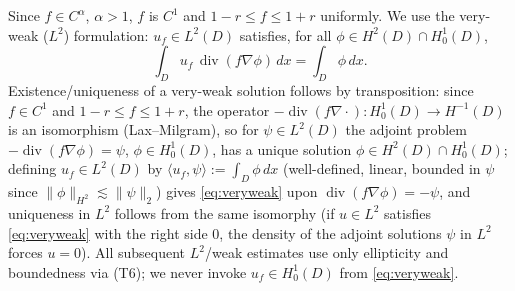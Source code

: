 \documentclass[11pt]{article}
\theoremstyle{remark}
\newcommand{\norm}[1]{\lVert #1\rVert}
\DeclareMathOperator{\diver}{div}
\begin{document}
Since $f\in C^{\alpha}$, $\alpha>1$, $f$ is $C^{1}$ and
$1-r\le f\le1+r$ uniformly. We use the very-weak ($L^{2}$) formulation:
$u_f\in L^{2}(D)$ satisfies, for all $\phi\in H^{2}(D)\cap H^{1}_{0}(D)$,
\begin{equation}\label{eq:veryweak}
\int_D u_f\,\diver(f\nabla\phi)\,dx=\int_D\phi\,dx .
\end{equation}
Existence/uniqueness of a very-weak solution follows by transposition:
since $f\in C^{1}$ and $1-r\le f\le1+r$, the operator
$-\diver(f\nabla\cdot):H^{1}_0(D)\to H^{-1}(D)$ is an isomorphism
(Lax--Milgram), so for $\psi\in L^{2}(D)$ the adjoint problem
$-\diver(f\nabla\phi)=\psi$, $\phi\in H^{1}_0(D)$, has a unique solution
$\phi\in H^{2}(D)\cap H^{1}_0(D)$; defining $u_f\in L^{2}(D)$ by
$\langle u_f,\psi\rangle:=\int_D\phi\,dx$ (well-defined, linear, bounded in
$\psi$ since $\norm{\phi}_{H^{2}}\lesssim\norm{\psi}_2$) gives
\eqref{eq:veryweak} upon $\diver(f\nabla\phi)=-\psi$, and uniqueness in
$L^{2}$ follows from the same isomorphy (if $u\in L^{2}$ satisfies
\eqref{eq:veryweak} with the right side $0$, the density of the adjoint
solutions $\psi$ in $L^{2}$ forces $u=0$). All subsequent $L^{2}$/weak
estimates use only ellipticity and boundedness via (T6); we never invoke
$u_f\in H^{1}_0(D)$ from \eqref{eq:veryweak}.
\end{document}
